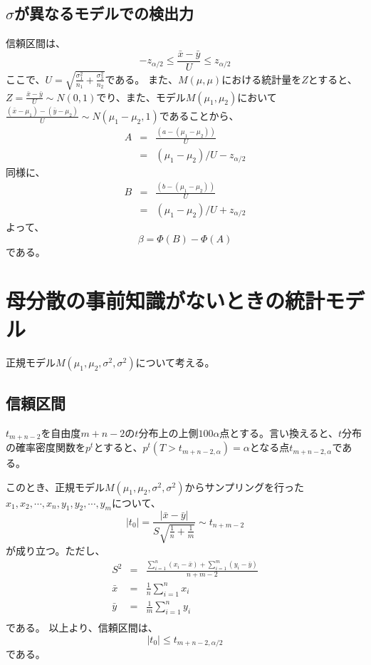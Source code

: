 \subsection{$\sigma$が異なるモデルでの検出力}
信頼区間は、
\begin{equation*}
    -z_{\alpha/2} \leq \frac{\bar{x}-\bar{y}}{U} \leq z_{\alpha/2}
\end{equation*}
ここで、$U=\sqrt{\frac{\sigma^2_1}{n_1}+\frac{\sigma^2_2}{n_2}}$である。
また、$M(\mu,\mu)$における統計量を$Z$とすると、$Z = \frac{\bar{x}-\bar{y}}{U}\sim N(0,1)$でり、また、モデル$M(\mu_1,\mu_2)$において$\frac{(\bar{x}-\mu_1)-(\bar{y}-\mu_2)}{U} \sim N(\mu_1-\mu_2,1)$であることから、
\begin{eqnarray*}
    A &=& \frac{(a-(\mu_1-\mu_2))}{U} \\
        &=& (\mu_1-\mu_2)/U-z_{\alpha/2}
\end{eqnarray*}
同様に、
\begin{eqnarray*}
    B &=& \frac{(b-(\mu_1-\mu_2))}{U} \\
        &=& (\mu_1-\mu_2)/U+z_{\alpha/2}
\end{eqnarray*}
よって、
\begin{equation*}
    \beta = \varPhi(B)-\varPhi(A)
\end{equation*}
である。



\section{母分散の事前知識がないときの統計モデル}
正規モデル$M(\mu_1,\mu_2,\sigma^2,\sigma^2)$について考える。

\subsection{信頼区間}
$t_{m+n-2}$を自由度$m+n-2$の$t$分布上の上側$100\alpha$点とする。言い換えると、$t$分布の確率密度関数を$p^t$とすると、$p^t(T > t_{m+n-2,\alpha}) = \alpha$となる点$t_{m+n-2,\alpha}$である。

このとき、正規モデル$M(\mu_1,\mu_2,\sigma^2,\sigma^2)$からサンプリングを行った$x_1,x_2,\cdots,x_n,y_1,y_2,\cdots,y_m$について、
\begin{equation*}
    |t_0| = \frac{|\bar{x}-\bar{y}|}{S\sqrt{\frac{1}{n}+\frac{1}{m}}}\sim t_{n+m-2}
\end{equation*}
が成り立つ。ただし、
\begin{eqnarray*}
    S^2 &=& \frac{\sum_{i=1}^n(x_i-\bar{x})+\sum_{i=1}^m (y_i-\bar{y})}{n+m-2} \\
    \bar{x} &=& \frac{1}{n}\sum_{i=1}^n x_i\\
    \bar{y} &=& \frac{1}{m}\sum_{i=1}^n y_i\\
\end{eqnarray*}
である。
以上より、信頼区間は、
\begin{equation*}
    |t_0| \leq t_{m+n-2,\alpha/2}
\end{equation*}
である。


